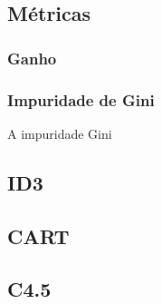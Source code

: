 \documentclass[12pt,a4paper]{article}
\begin{document}
\subsection{Métricas}
\subsubsection{Ganho}

\subsubsection{Impuridade de Gini}
A impuridade Gini

\subsection{ID3}

\subsection{CART}

\subsection{C4.5}

 
\end{document}

